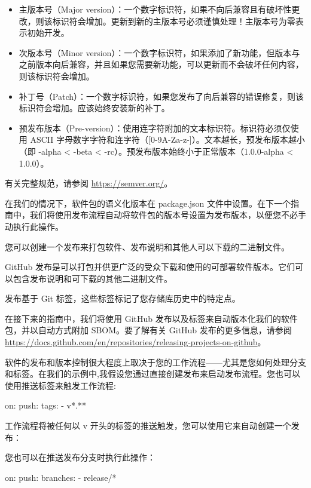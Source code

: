 \begin{itemize}
\item 
主版本号（Major version）：一个数字标识符，如果不向后兼容且有破坏性更改，则该标识符会增加。更新到新的主版本号必须谨慎处理！主版本号为零表示初始开发。

\item 
次版本号（Minor version）：一个数字标识符，如果添加了新功能，但版本与之前版本向后兼容，并且如果您需要新功能，可以更新而不会破坏任何内容，则该标识符会增加。

\item 
补丁号（Patch）：一个数字标识符，如果您发布了向后兼容的错误修复，则该标识符会增加。应该始终安装新的补丁。

\item 
预发布版本（Pre-version）：使用连字符附加的文本标识符。标识符必须仅使用 ASCII 字母数字字符和连字符（[0-9A-Za-z-]）。文本越长，预发布版本越小（即 -alpha < -beta < -rc）。预发布版本始终小于正常版本（1.0.0-alpha < 1.0.0）。
\end{itemize}

有关完整规范，请参阅 \url{https://semver.org/}。

在我们的情况下，软件包的语义化版本在 package.json 文件中设置。在下一个指南中，我们将使用发布流程自动将软件包的版本号设置为发布版本，以便您不必手动执行此操作。


您可以创建一个发布来打包软件、发布说明和其他人可以下载的二进制文件。

GitHub 发布是可以打包并供更广泛的受众下载和使用的可部署软件版本。它们可以包含发布说明和可下载的其他二进制文件。

发布基于 Git 标签，这些标签标记了您存储库历史中的特定点。

在接下来的指南中，我们将使用 GitHub 发布以及标签来自动版本化我们的软件包，并以自动方式附加 SBOM。要了解有关 GitHub 发布的更多信息，请参阅 \url{https://docs.github.com/en/repositories/releasing-projects-on-github}。


软件的发布和版本控制很大程度上取决于您的工作流程——尤其是您如何处理分支和标签。在我们的示例中,我假设您通过直接创建发布来启动发布流程。您也可以使用推送标签来触发工作流程:

\begin{shell}
on:
  push:
    tags:
      - v*.**
\end{shell}

工作流程将被任何以 v 开头的标签的推送触发，您可以使用它来自动创建一个发布：


您也可以在推送发布分支时执行此操作：

\begin{shell}
on:
  push:
    branches:
      - release/*
\end{shell}






